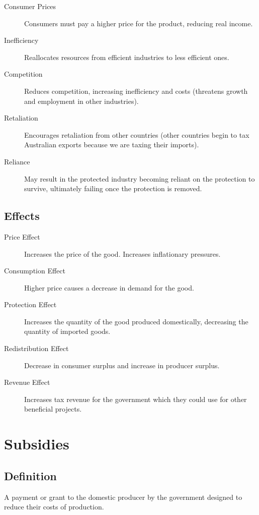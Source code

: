 \documentclass[a4paper,11pt]{article}
\begin{document}
\begin{description}
\item [Consumer Prices] Consumers must pay a higher price for the product,
	reducing real income.
\item [Inefficiency] Reallocates resources from efficient industries to less
	efficient ones.
\item [Competition] Reduces competition, increasing inefficiency and costs
	(threatens growth and employment in other industries).
\item [Retaliation] Encourages retaliation from other countries (other countries
	begin to tax Australian exports because we are taxing their imports).
\item [Reliance] May result in the protected industry becoming reliant on the
	protection to survive, ultimately failing once the protection is removed.
\end{description}


\subsection{Effects}

\begin{description}
\item [Price Effect] Increases the price of the good. Increases
	inflationary pressures.
\item [Consumption Effect] Higher price causes a decrease in demand for
	the good.
\item [Protection Effect] Increases the quantity of the good produced
	domestically, decreasing the quantity of imported goods.
\item [Redistribution Effect] Decrease in consumer surplus and increase
	in producer surplus.
\item [Revenue Effect] Increases tax revenue for the government which
	they could use for other beneficial projects.
\end{description}




\section{Subsidies}

\subsection{Definition}

A payment or grant to the domestic producer by the government designed to reduce
their costs of production.
\end{document}
